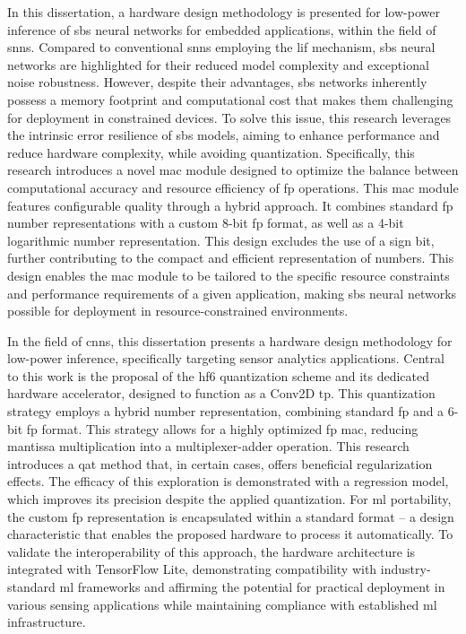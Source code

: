 In this dissertation, a hardware design methodology is presented for low-power inference of \gls{sbs} neural networks for embedded applications, within the field of \glspl{snn}. Compared to conventional \glspl{snn} employing the \gls{lif} mechanism, \gls{sbs} neural networks are highlighted for their reduced model complexity and exceptional noise robustness. However, despite their advantages, \gls{sbs} networks inherently possess a memory footprint and computational cost that makes them challenging for deployment in constrained devices. To solve this issue, this research leverages the intrinsic error resilience of \gls{sbs} models, aiming to enhance performance and reduce hardware complexity, while avoiding quantization. Specifically, this research introduces a novel \gls{mac} module designed to optimize the balance between computational accuracy and resource efficiency of \gls{fp} operations. This \gls{mac} module features configurable quality through a hybrid approach. It combines standard \gls{fp} number representations with a custom 8-bit \gls{fp} format, as well as a 4-bit logarithmic number representation. This design excludes the use of a sign bit, further contributing to the compact and efficient representation of numbers. This design enables the \gls{mac} module to be tailored to the specific resource constraints and performance requirements of a given application, making \gls{sbs} neural networks possible for deployment in resource-constrained environments.

In the field of \glspl{cnn}, this dissertation presents a hardware design methodology for low-power inference, specifically targeting sensor analytics applications. Central to this work is the proposal of the \gls{hf6} quantization scheme and its dedicated hardware accelerator, designed to function as a Conv2D \gls{tp}. This quantization strategy employs a hybrid number representation, combining standard \gls{fp} and a 6-bit \gls{fp} format. This strategy allows for a highly optimized \gls{fp} \gls{mac}, reducing mantissa multiplication into a multiplexer-adder operation. This research introduces a \gls{qat} method that, in certain cases, offers beneficial regularization effects. The efficacy of this exploration is demonstrated with a regression model, which improves its precision despite the applied quantization. For \gls{ml} portability, the custom \gls{fp} representation is encapsulated within a standard format -- a design characteristic that enables the proposed hardware to process it automatically. To validate the interoperability of this approach, the hardware architecture is integrated with TensorFlow Lite, demonstrating compatibility with industry-standard \gls{ml} frameworks and affirming the potential for practical deployment in various sensing applications while maintaining compliance with established \gls{ml} infrastructure.


